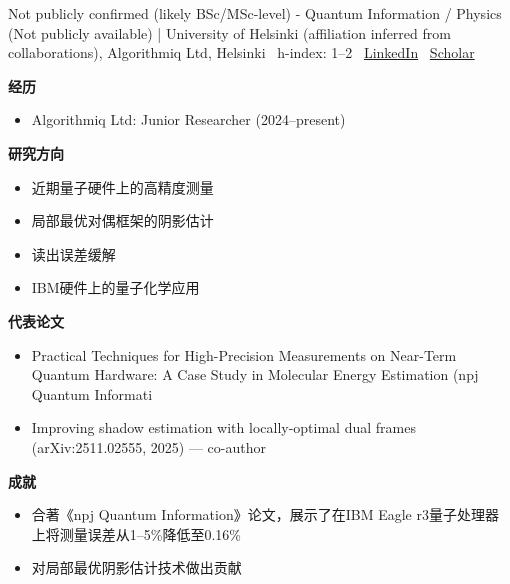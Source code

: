 \vspace{4pt}
\par{\footnotesize\color{graytext}Not publicly confirmed (likely BSc/MSc-level) - Quantum Information / Physics (Not publicly available) | University of Helsinki (affiliation inferred from collaborations), Algorithmiq Ltd, Helsinki \textbar\  h-index: 1–2 \textbar\  \href{https://www.linkedin.com/in/hetta-vappula-628055149/}{LinkedIn} \textbar\  \href{Not publicly found (Semantic Scholar author: https://www.semanticscholar.org/author/Hetta-Vappula/2319602989)}{Scholar}}
\par{\footnotesize\color{mainred}\textbf{经历}}
\begin{itemize}[leftmargin=1.2em,itemsep=0pt,topsep=0pt]
\item {\footnotesize Algorithmiq Ltd: Junior Researcher (2024–present)}
\end{itemize}
\par{\footnotesize\color{mainred}\textbf{研究方向}}
\begin{itemize}[leftmargin=1.2em,itemsep=0pt,topsep=0pt]
\item {\footnotesize 近期量子硬件上的高精度测量}
\item {\footnotesize 局部最优对偶框架的阴影估计}
\item {\footnotesize 读出误差缓解}
\item {\footnotesize IBM硬件上的量子化学应用}
\end{itemize}
\par{\footnotesize\color{mainred}\textbf{代表论文}}
\begin{itemize}[leftmargin=1.2em,itemsep=0pt,topsep=0pt]
\item {\footnotesize Practical Techniques for High-Precision Measurements on Near-Term Quantum Hardware: A Case Study in Molecular Energy Estimation (npj Quantum Informati}
\item {\footnotesize Improving shadow estimation with locally-optimal dual frames (arXiv:2511.02555, 2025) — co-author}
\end{itemize}
\par{\footnotesize\color{mainred}\textbf{成就}}
\begin{itemize}[leftmargin=1.2em,itemsep=0pt,topsep=0pt]
\item {\footnotesize 合著《npj Quantum Information》论文，展示了在IBM Eagle r3量子处理器上将测量误差从1–5\%降低至0.16\%}
\item {\footnotesize 对局部最优阴影估计技术做出贡献}
\end{itemize}
